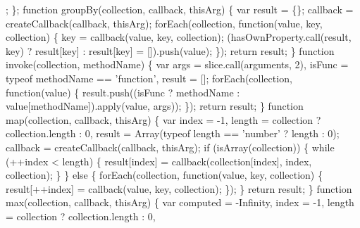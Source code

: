 \begin{DoxyCodeInclude}
{{\textcolor{stringliteral}{    ;}
\textcolor{stringliteral}{    }
\textcolor{stringliteral}{  \};}
\textcolor{stringliteral}{}
\textcolor{stringliteral}{  function groupBy(collection, callback, thisArg) \{}
\textcolor{stringliteral}{    var result = \{\};}
\textcolor{stringliteral}{    callback = createCallback(callback, thisArg);}
\textcolor{stringliteral}{    forEach(collection, function(value, key, collection) \{}
\textcolor{stringliteral}{      key = callback(value, key, collection);}
\textcolor{stringliteral}{      (hasOwnProperty.call(result, key) ? result[key] : result[key] = []).push(value);}
\textcolor{stringliteral}{    \});}
\textcolor{stringliteral}{    return result;}
\textcolor{stringliteral}{  \}}
\textcolor{stringliteral}{}
\textcolor{stringliteral}{  function invoke(collection, methodName) \{}
\textcolor{stringliteral}{    var args = slice.call(arguments, 2),}
\textcolor{stringliteral}{        isFunc = typeof methodName == 'function',}
\textcolor{stringliteral}{        result = [];}
\textcolor{stringliteral}{}
\textcolor{stringliteral}{    forEach(collection, function(value) \{}
\textcolor{stringliteral}{      result.push((isFunc ? methodName : value[methodName]).apply(value, args));}
\textcolor{stringliteral}{    \});}
\textcolor{stringliteral}{    return result;}
\textcolor{stringliteral}{  \}}
\textcolor{stringliteral}{}
\textcolor{stringliteral}{  function map(collection, callback, thisArg) \{}
\textcolor{stringliteral}{    var index = -1,}
\textcolor{stringliteral}{        length = collection ? collection.length : 0,}
\textcolor{stringliteral}{        result = Array(typeof length == 'number' ? length : 0);}
\textcolor{stringliteral}{}
\textcolor{stringliteral}{    callback = createCallback(callback, thisArg);}
\textcolor{stringliteral}{    if (isArray(collection)) \{}
\textcolor{stringliteral}{      while (++index < length) \{}
\textcolor{stringliteral}{        result[index] = callback(collection[index], index, collection);}
\textcolor{stringliteral}{      \}}
\textcolor{stringliteral}{    \} else \{}
\textcolor{stringliteral}{      forEach(collection, function(value, key, collection) \{}
\textcolor{stringliteral}{        result[++index] = callback(value, key, collection);}
\textcolor{stringliteral}{      \});}
\textcolor{stringliteral}{    \}}
\textcolor{stringliteral}{    return result;}
\textcolor{stringliteral}{  \}}
\textcolor{stringliteral}{}
\textcolor{stringliteral}{  function max(collection, callback, thisArg) \{}
\textcolor{stringliteral}{    var computed = -Infinity,}
\textcolor{stringliteral}{        index = -1,}
\textcolor{stringliteral}{        length = collection ? collection.length : 0,}
}}
\end{DoxyCodeInclude}
